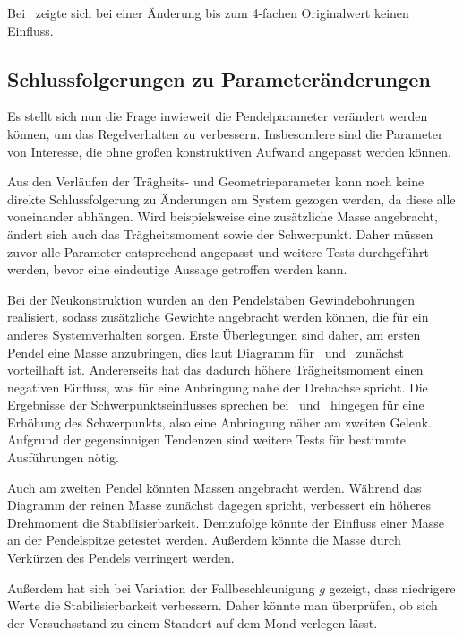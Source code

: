 Bei \Mczo\ zeigte sich bei einer Änderung bis zum 4-fachen Originalwert keinen Einfluss.


\subsection{Schlussfolgerungen zu Parameteränderungen}

Es stellt sich nun die Frage inwieweit die Pendelparameter verändert werden können, um das Regelverhalten zu verbessern.
Insbesondere sind die Parameter von Interesse, die ohne großen konstruktiven Aufwand angepasst werden können.

Aus den Verläufen der Trägheits- und Geometrieparameter kann noch keine direkte Schlussfolgerung zu Änderungen am System gezogen werden, da diese alle voneinander abhängen.
Wird beispielsweise eine zusätzliche Masse angebracht, ändert sich auch das Trägheitsmoment sowie der Schwerpunkt.
Daher müssen zuvor alle Parameter entsprechend angepasst und weitere Tests durchgeführt werden, bevor eine eindeutige Aussage getroffen werden kann.

Bei der Neukonstruktion \cite{chang} wurden an den Pendelstäben Gewindebohrungen realisiert, sodass zusätzliche Gewichte angebracht werden können, die für ein anderes Systemverhalten sorgen.
Erste Überlegungen sind daher, am ersten Pendel eine Masse anzubringen, dies laut Diagramm für \apd\ und \apv\ zunächst vorteilhaft ist.
Andererseits hat das dadurch höhere Trägheitsmoment einen negativen Einfluss, was für eine Anbringung nahe der Drehachse spricht.
Die Ergebnisse der Schwerpunktseinflusses sprechen bei \apd\ und \apv\ hingegen für eine Erhöhung des Schwerpunkts, also eine Anbringung näher am zweiten Gelenk. 
Aufgrund der gegensinnigen Tendenzen sind weitere Tests für bestimmte Ausführungen nötig.

Auch am zweiten Pendel könnten Massen angebracht werden.
Während das Diagramm der reinen Masse zunächst dagegen spricht, verbessert ein höheres Drehmoment die Stabilisierbarkeit.
Demzufolge könnte der Einfluss einer Masse an der Pendelspitze getestet werden.
Außerdem könnte die Masse durch Verkürzen des Pendels verringert werden.

Außerdem hat sich bei Variation der Fallbeschleunigung $g$ gezeigt, dass niedrigere Werte die Stabilisierbarkeit verbessern.
Daher könnte man überprüfen, ob sich der Versuchsstand zu einem Standort auf dem Mond verlegen lässt.